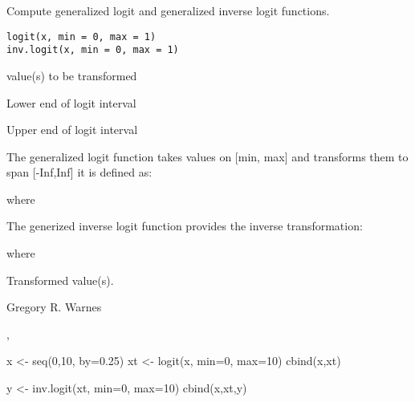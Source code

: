 \begin{Description}\relax
Compute generalized logit and generalized inverse logit functions.
\end{Description}
\begin{Usage}
\begin{verbatim}
logit(x, min = 0, max = 1)
inv.logit(x, min = 0, max = 1)
\end{verbatim}
\end{Usage}
\begin{Arguments}
\begin{ldescription}
\item[\code{x}] value(s) to be transformed
\item[\code{min}] Lower end of logit interval
\item[\code{max}] Upper end of logit interval
\end{ldescription}
\end{Arguments}
\begin{Details}\relax
The generalized logit function takes values on [min, max] and
transforms them to span [-Inf,Inf] it is defined as:


where


The generized inverse logit function provides the inverse
transformation:


where

\end{Details}
\begin{Value}
Transformed value(s).
\end{Value}
\begin{Author}\relax
Gregory R. Warnes 
\end{Author}
\begin{SeeAlso}\relax
{}, 
\end{SeeAlso}
\begin{Examples}
\begin{ExampleCode}

  x <- seq(0,10, by=0.25)
  xt <- logit(x, min=0, max=10)
  cbind(x,xt)

  y <- inv.logit(xt, min=0, max=10)
  cbind(x,xt,y)  

\end{ExampleCode}
\end{Examples}

